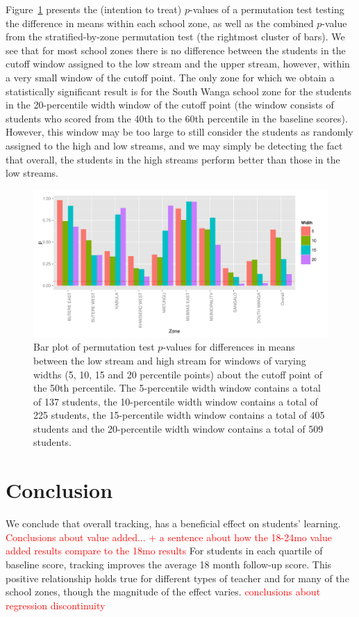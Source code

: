\documentclass[11pt]{article}
\begin{document}
Figure~\ref{fig:pval_window} presents the (intention to treat) $p$-values of a permutation test testing the difference in means within each school zone, as well as the combined $p$-value from the stratified-by-zone permutation test (the rightmost cluster of bars). We see that for most school zones there is no difference between the students in the cutoff window assigned to the low stream and the upper stream, however, within a very small window of the cutoff point. The only zone for which we obtain a statistically significant result is for the South Wanga school zone for the students in the 20-percentile width window of the cutoff point (the window consists of students who scored from the 40th to the 60th percentile in the baseline scores). However, this window may be too large to still consider the students as randomly assigned to the high and low streams, and we may simply be detecting the fact that overall, the students in the high streams perform better than those in the low streams. 
 
  \begin{figure}[H]
 \centering
 \includegraphics[scale=0.6]{RD_pval.pdf}
 \caption{Bar plot of permutation test $p$-values for differences in means between the low stream and high stream for windows of varying widths (5, 10, 15 and 20 percentile points) about the cutoff point of the 50th percentile. The 5-percentile width window contains a total of 137 students, the 10-percentile width window contains a total of 225 students, the 15-percentile width window contains a total of 405 students and the 20-percentile width window contains a total of 509 students.}
 \label{fig:pval_window}
 \end{figure}
 
 
 
 
 
 
\section{Conclusion}
We conclude that overall tracking, has a beneficial effect on students' learning. \textcolor{red}{Conclusions about value added... + a sentence about how the 18-24mo value added results compare to the 18mo results}  For students in each quartile of baseline score, tracking improves the average 18 month follow-up score.  This positive relationship holds true for different types of teacher and for many of the school zones, though the magnitude of the effect varies. \textcolor{red}{conclusions about regression discontinuity} \\
\end{document}
